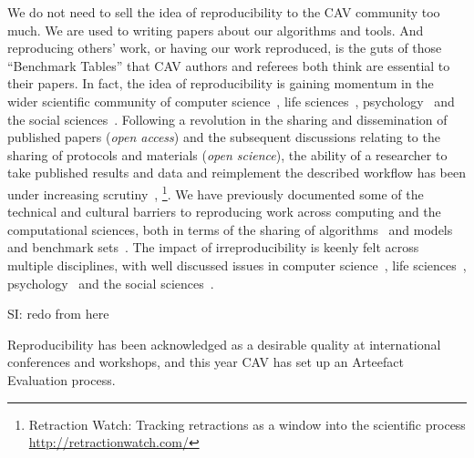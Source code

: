 \documentclass{llncs}
\begin{document}
We do not need to sell the idea of reproducibility to the CAV
community too much. We are used to writing papers about our algorithms
and tools.  And reproducing others' work, or having our work
reproduced, is the guts of those ``Benchmark Tables'' that CAV authors
and referees both think are essential to their papers. In fact, the
idea of reproducibility is gaining momentum in the wider scientific
community of computer science~\cite{collberg-et-al:2014}, life
sciences~\cite{rollins-et-al:2014},
psychology~\cite{chambers-et-al:2014} and the social
sciences~\cite{conte-et-al:2012}.
Following a revolution in the sharing and dissemination of published
papers (\emph{open access}) and the subsequent discussions relating to
the sharing of protocols and materials (\emph{open science}), the
ability of a researcher to take published results and data and
reimplement the described workflow has been under increasing
scrutiny~\cite{stodden-et-al:2013,sandve-et-al:2013,wilson-et-al:2014},
\footnote{Retraction Watch: Tracking retractions as a window
into the scientific
process\\\url{http://retractionwatch.com/}}. 
We have previously documented some of
the technical and cultural barriers to reproducing work across
computing and the computational sciences, both in terms of the sharing
of algorithms~\cite{crick-et-al_recomp2014} and models and benchmark
sets~\cite{crick-et-al_wssspe2}. The impact of irreproducibility is
keenly felt across multiple disciplines, with well discussed issues in
computer science~\cite{collberg-et-al:2014}, life
sciences~\cite{rollins-et-al:2014},
psychology~\cite{chambers-et-al:2014} and the social
sciences~\cite{conte-et-al:2012}.



SI: redo from here 

Reproducibility has been acknowledged as a desirable quality at 
international conferences and workshops, and this year CAV has 
set up an Arteefact
Evaluation process. 
\end{document}
